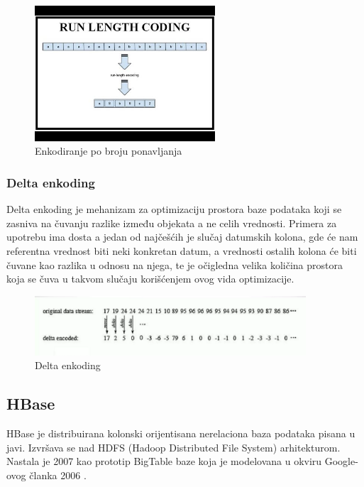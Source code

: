\documentclass[12pt,oneside]{memoir}
\begin{document}
\begin{figure}[!ht]
  \centering
  \includegraphics[width=0.6\textwidth]{run-length-encoding.jpg}
  \caption{Enkodiranje po broju ponavljanja}
  \label{fig:grafikon}
\end{figure}

\subsubsection{Delta enkoding}
Delta enkoding je mehanizam za optimizaciju prostora baze podataka koji se zasniva na čuvanju razlike između objekata a ne celih vrednosti. Primera za upotrebu ima dosta a jedan od najčešćih je slučaj datumskih kolona, gde će nam referentna vrednost biti neki konkretan datum, a vrednosti ostalih kolona će biti čuvane kao razlika u odnosu na njega, te je očigledna velika količina prostora koja se čuva u takvom slučaju korišćenjem ovog vida optimizacije.

\begin{figure}[!ht]
  \centering
  \includegraphics[width=0.9\textwidth]{delta-encoding.png}
  \caption{Delta enkoding}
  \label{fig:grafikon}
\end{figure}

\subsection{HBase}

HBase je distribuirana kolonski orijentisana nerelaciona baza podataka  pisana u javi. Izvršava se nad HDFS (Hadoop Distributed File System) arhitekturom. Nastala je 2007 kao prototip BigTable baze koja je modelovana u okviru Google-ovog članka 2006 \cite{BigTable}. 
\end{document}
